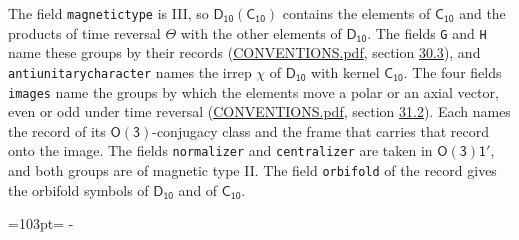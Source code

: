 \documentclass[10pt,a4paper]{article}
\newcommand{\needspace}[1]{\par\penalty-100\begingroup\dimen0=#1\relax\dimen2=\pagegoal
  \advance\dimen2-\pagetotal\ifdim\dimen0>\dimen2\relax\ifdim\dimen2>0pt\vfil\break\fi\fi
  \endgroup}
\numberwithin{equation}{section}
\newcommand{\grp}[1]{\mathsf{#1}}
\begin{document}
The field \texttt{magnetictype} is III, so $\grp{D_{10}}(\grp{C_{10}})$ contains the elements of $\grp{C_{10}}$ and the products of time reversal $\varTheta$ with the other elements of $\grp{D_{10}}$. The fields \texttt{G} and \texttt{H} name these groups by their records (\href{../../CONVENTIONS.pdf}{CONVENTIONS.pdf}, section \href{../../CONVENTIONS.pdf\#conv.30.3}{30.3}), and \texttt{antiunitarycharacter} names the irrep $\chi$ of $\grp{D_{10}}$ with kernel $\grp{C_{10}}$. The four fields \texttt{images} name the groups by which the elements move a polar or an axial vector, even or odd under time reversal (\href{../../CONVENTIONS.pdf}{CONVENTIONS.pdf}, section \href{../../CONVENTIONS.pdf\#conv.31.2}{31.2}). Each names the record of its $\grp{O(3)}$-conjugacy class and the frame that carries that record onto the image. The fields \texttt{normalizer} and \texttt{centralizer} are taken in $\grp{O(3)1'}$, and both groups are of magnetic type II. The field \texttt{orbifold} of the record gives the orbifold symbols of $\grp{D_{10}}$ and of $\grp{C_{10}}$.
\needspace{103pt}
\end{document}
